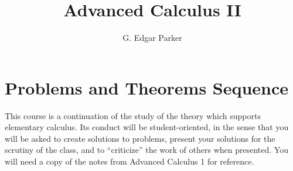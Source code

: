 \documentclass{article}
\let\titlepageAuthor\author
\renewcommand{\author}[1]{\newcommand{\headerAuthor}{#1}\titlepageAuthor{#1}}
\let\titlepageTitle\title
\renewcommand{\title}[1]{\newcommand{\headerTitle}{#1}\titlepageTitle{#1}}
\begin{document}
\title{Advanced Calculus II}
\author{G. Edgar Parker}
\date{ }
\maketitle
\thispagestyle{empty}



\newpage

\setcounter{tocdepth}{3} 
\tableofcontents
\thispagestyle{empty}



\newpage

\section{Problems and Theorems Sequence}


This course is a continuation of the study of the theory which supports elementary calculus. Its conduct will be student-oriented, in the sense that you will be asked to create solutions to problems, present your solutions for the scrutiny of the class, and to ``criticize'' the work of others when presented. You will need a copy of the notes from Advanced Calculus 1 for reference.
\end{document}
